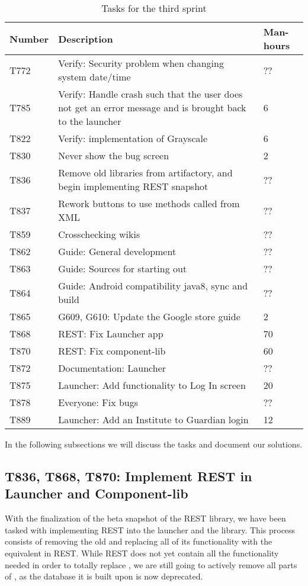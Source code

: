 \begin{table}[H]
\begin{centering}
\begin{tabular}{|l|p{9cm}|l|}
\hline
Number 	& Description & Man-hours \\ \hline
T772    & Verify: Security problem when changing system date/time & ??\\\hline
T785	& Verify: Handle crash such that the user does not get an error message and
is brought back to the launcher & 6\\ \hline
T822    & Verify: implementation of Grayscale & 6\\\hline
T830    & Never show the bug screen & 2 \\\hline
T836	& Remove old libraries from artifactory, and begin implementing REST
snapshot & ??\\\hline
T837	& Rework buttons to use methods called from XML & ??\\\hline
T859   	& Crosschecking wikis & ??\\\hline
T862  	& Guide: General development & ?? \\ \hline
T863	& Guide: Sources for starting out & ??\\ \hline
T864	& Guide: Android compatibility java8, sync and build & ??\\
\hline 
T865	& G609, G610: Update the Google store guide & 2\\\hline
T868    & REST: Fix Launcher app & 70 \\\hline
T870    & REST: Fix component-lib & 60\\\hline
T872 	& Documentation: Launcher & ??\\ \hline
T875 	& Launcher: Add functionality to Log In screen & 20\\\hline 
T878 	& Everyone: Fix bugs & ??\\ \hline
T889	& Launcher: Add an Institute to Guardian login & 12 \\\hline
\end{tabular}
\caption{Tasks for the third sprint}
\label{Tasks3}
\end{centering}
\end{table}

In the following subsections we will discuss the tasks and document our
solutions.

\subsection{T836, T868, T870: Implement REST in Launcher and
Component-lib}\label{T836_T868_T870} 
With the finalization of the beta snapshot of the
REST library, we have been tasked with implementing REST into the launcher and
the  library. This process consists of removing the old  and replacing
all of its functionality with the equivalent in REST. While REST does not yet
contain all the functionality needed in order to totally replace ,
we are still going to actively remove all parts of , as the
database it is built upon is now deprecated.\nl

